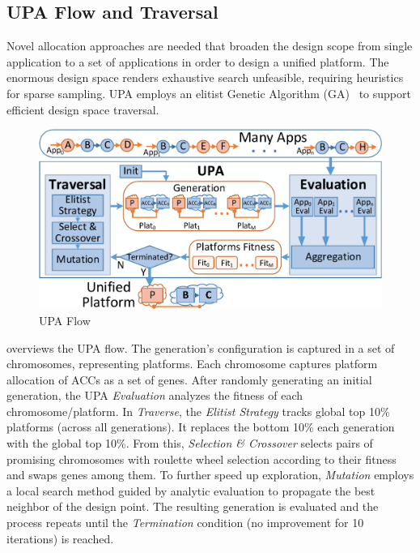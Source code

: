 \newcommand{\dsename}[1]{\textit{#1}}

\vspace{-2pt}
\subsection{UPA Flow and Traversal}
\label{subsec:MAAR}

Novel allocation approaches are needed that broaden the design scope from single application to a set of applications in order to design a unified platform. The enormous design space renders exhaustive search unfeasible, requiring heuristics for sparse sampling. UPA employs an elitist Genetic Algorithm (GA)~\cite{quan2014towards} to support efficient design space traversal.

\begin{figure}[h]
	\centering
	\includegraphics[width=.9\linewidth]{fig/MAARflowDetial.pdf}
	\vspace{-4pt}
	\caption{UPA Flow}
	\label{fig:MAARflowDetial}
\end{figure}

 overviews the UPA flow. The generation's configuration is captured in a set of chromosomes, representing platforms. Each chromosome captures platform allocation of ACCs as a set of genes. After randomly generating an initial generation, the UPA \dsename{Evaluation} analyzes the fitness of each chromosome/platform. In \dsename{Traverse}, the \dsename{Elitist Strategy} tracks global top 10\% platforms (across all generations). It replaces the bottom 10\% each generation with the global top 10\%. From this, \dsename{Selection \& Crossover} selects pairs of promising chromosomes with roulette wheel selection according to their fitness and swaps genes among them. To further speed up exploration, \dsename{Mutation} employs a local search method guided by analytic evaluation to propagate the best neighbor of the design point. The resulting generation is evaluated and the process repeats until the \dsename{Termination} condition (no improvement for 10 iterations) is reached.